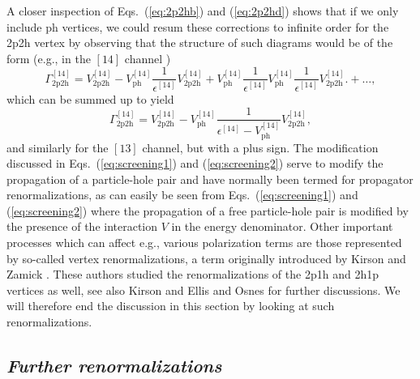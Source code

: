\documentclass[twoside,12pt]{article}
\begin{document}
A closer inspection of Eqs.\ (\ref{eq:2p2hb}) and
(\ref{eq:2p2hd}) shows that if we only include ph vertices,
we could resum these corrections to infinite
order for the 2p2h vertex by observing that the
structure of such diagrams would be of the form
(e.g., in the $[14]$ channel )
\begin{equation}
       \Gamma_{\mathrm{2p2h}}^{[14]}=V^{[14]}_{\mathrm{2p2h}}-
        V^{[14]}_{\mathrm{ph}}
        \frac{1}{\epsilon^{[14]}}
        V_{\mathrm{2p2h}}^{[14]}+
        V^{[14]}_{\mathrm{ph}}
        \frac{1}{\epsilon^{[14]}}
        V^{[14]}_{\mathrm{ph}}
        \frac{1}{\epsilon^{[14]}}
        V^{[14]}_{\mathrm{2p2h}}.
             +\dots,
\end{equation}
which can be summed up to yield
\begin{equation}
  \Gamma^{[14]}_{\mathrm{2p2h}}=V^{[14]}_{\mathrm{2p2h}}-
   V^{[14]}_{\mathrm{ph}}
   \frac{1}
   {\epsilon^{[14]}-V^{[14]}_{\mathrm{ph}}}
   V^{[14]}_{\mathrm{2p2h}},
   \label{eq:screening2}
\end{equation}
and similarly for the $[13]$ channel, but with a plus sign.
The modification discussed in Eqs.\ (\ref{eq:screening1})
and (\ref{eq:screening2})
serve to modify the propagation of a particle-hole pair
and have normally been termed for propagator
renormalizations, as can easily be seen from
Eqs.\ (\ref{eq:screening1})
and (\ref{eq:screening2}) where the propagation of
a free particle-hole pair is modified by the presence
of the interaction $V$ in the energy denominator.
Other important processes which can affect e.g.,
various polarization terms are those
represented by so-called vertex renormalizations,
a term originally introduced by Kirson and Zamick \cite{kz70}.
These authors studied the renormalizations of the
2p1h and 2h1p vertices as well, see also Kirson \cite{kirson74}
and Ellis and Osnes \cite{eo77} for further discussions.
We will therefore end the discussion in this section
by looking at such renormalizations.

\subsection{\it Further renormalizations}
\end{document}
